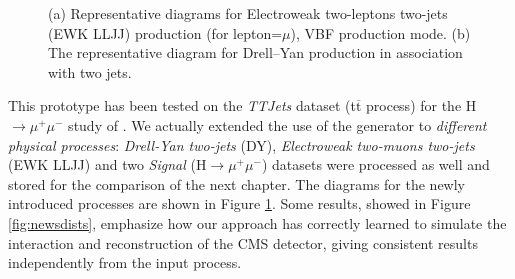\begin{figure}
    \myfloatalign
    \caption[EWK LLJJ and DY diagrams]{ (a) Representative diagrams for Electroweak two-leptons two-jets (EWK LLJJ) production (for lepton=$\mu$), VBF production mode. (b) The representative diagram for Drell–Yan production in association with two jets.}\label{fig:newdiag}
    
\end{figure}

This prototype has been tested on the \emph{TTJets} dataset (t$\overline{\text{t}}$ process) for the H$\rightarrow\mu^+\mu^-$ study of \cite{Sirunyan_2021}. We actually extended the use of the generator to \emph{different physical processes}: \emph{Drell-Yan two-jets} (DY), \emph{Electroweak two-muons two-jets} (EWK LLJJ) and two \emph{Signal} (H$\rightarrow\mu^+\mu^-$) datasets were processed as well and stored for the comparison of the next chapter. The diagrams for the newly introduced processes are shown in Figure \ref{fig:newdiag}. Some results, showed in Figure \ref{fig:newsdists}, emphasize how our approach has correctly learned to simulate the interaction and reconstruction of the CMS detector, giving consistent results independently from the input process.

